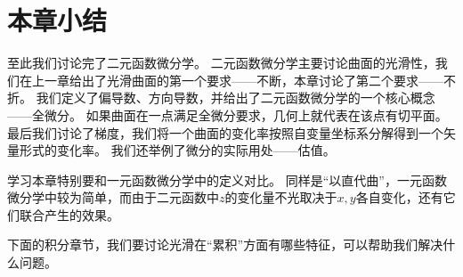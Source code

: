 \section{本章小结}

至此我们讨论完了二元函数微分学。
二元函数微分学主要讨论曲面的光滑性，我们在上一章给出了光滑曲面的第一个要求——不断，本章讨论了第二个要求——不折。
我们定义了偏导数、方向导数，并给出了二元函数微分学的一个核心概念——全微分。
如果曲面在一点满足全微分要求，几何上就代表在该点有切平面。
最后我们讨论了梯度，我们将一个曲面的变化率按照自变量坐标系分解得到一个矢量形式的变化率。
我们还举例了微分的实际用处——估值。

学习本章特别要和一元函数微分学中的定义对比。
同样是“以直代曲”，一元函数微分学中较为简单，而由于二元函数中$z$的变化量不光取决于$x,y$各自变化，还有它们联合产生的效果。

下面的积分章节，我们要讨论光滑在“累积”方面有哪些特征，可以帮助我们解决什么问题。




